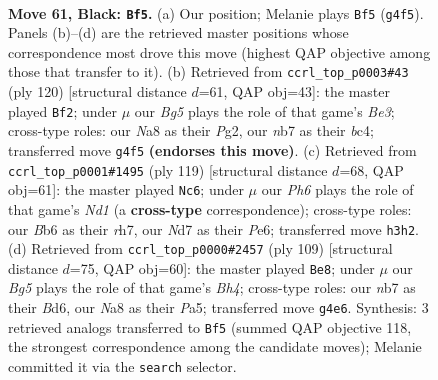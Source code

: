 \documentclass[11pt]{article}
\begin{document}
\clearpage

\begin{figure}[p]\centering
\begin{subfigure}{0.46\textwidth}\centering
\resizebox{\linewidth}{!}{%
\newchessgame
\chessboard[
  setfen={n7/1N1n1k2/1b5B/p2p4/6b1/PP2P2p/4PK2/3B4 b - - 4 61},
  showmover=false,
  pgfstyle=straightmove, color=movearrow, markmove={g4-f5}
]}
\caption{}
\end{subfigure}\hfill
\begin{subfigure}{0.46\textwidth}\centering
\resizebox{\linewidth}{!}{%
\newchessgame
\chessboard[
  setfen={6k1/1B3p2/Pb4pK/2p1P2p/2b4P/4B3/6P1/8 w - - 25 61},
  showmover=false,
  pgfstyle=straightmove, color=movearrow, markmove={e3-f2}
]}
\caption{}
\end{subfigure}
\\[4pt]
\begin{subfigure}{0.46\textwidth}\centering
\resizebox{\linewidth}{!}{%
\newchessgame
\chessboard[
  setfen={2kn4/1p5R/4pbr1/1p3p2/1P1P4/P7/1B2BP2/5K2 b - - 4 60},
  showmover=false,
  pgfstyle=straightmove, color=movearrow, markmove={d8-c6}
]}
\caption{}
\end{subfigure}\hfill
\begin{subfigure}{0.46\textwidth}\centering
\resizebox{\linewidth}{!}{%
\newchessgame
\chessboard[
  setfen={8/1p2k3/2pb1p2/p6b/P4P2/1B2PP2/1P2K3/5N2 b - - 52 55},
  showmover=false,
  pgfstyle=straightmove, color=movearrow, markmove={h5-e8}
]}
\caption{}
\end{subfigure}
\caption{\textbf{Move 61, Black: \texttt{Bf5}.} (a) Our position; Melanie plays \texttt{Bf5} (\texttt{g4f5}). Panels (b)--(d) are the retrieved master positions whose correspondence most drove this move (highest QAP objective among those that transfer to it). (b) Retrieved from \texttt{ccrl\_top\_p0003\#43} (ply 120) [structural distance $d$=61, QAP obj=43]: the master played \texttt{Bf2}; under $\mu$ our \emph{Bg5} plays the role of that game's \emph{Be3}; cross-type roles: our \emph{N}a8 as their \emph{P}g2, our \emph{n}b7 as their \emph{b}c4; transferred move \texttt{g4f5} \textbf{(endorses this move)}. (c) Retrieved from \texttt{ccrl\_top\_p0001\#1495} (ply 119) [structural distance $d$=68, QAP obj=61]: the master played \texttt{Nc6}; under $\mu$ our \emph{Ph6} plays the role of that game's \emph{Nd1} (a \textbf{cross-type} correspondence); cross-type roles: our \emph{B}b6 as their \emph{r}h7, our \emph{N}d7 as their \emph{P}e6; transferred move \texttt{h3h2}. (d) Retrieved from \texttt{ccrl\_top\_p0000\#2457} (ply 109) [structural distance $d$=75, QAP obj=60]: the master played \texttt{Be8}; under $\mu$ our \emph{Bg5} plays the role of that game's \emph{Bh4}; cross-type roles: our \emph{n}b7 as their \emph{B}d6, our \emph{N}a8 as their \emph{P}a5; transferred move \texttt{g4e6}. Synthesis: 3 retrieved analogs transferred to \texttt{Bf5} (summed QAP objective 118, the strongest correspondence among the candidate moves); Melanie committed it via the \texttt{search} selector.}
\label{fig:thought-m121}
\end{figure}
\end{document}
